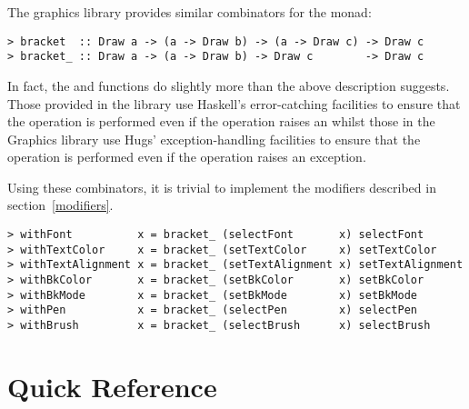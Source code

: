 
The graphics library provides similar combinators for the 
monad:
\begin{verbatim}
> bracket  :: Draw a -> (a -> Draw b) -> (a -> Draw c) -> Draw c
> bracket_ :: Draw a -> (a -> Draw b) -> Draw c        -> Draw c
\end{verbatim}

\begin{aside}
In fact, the  and  functions do slightly
more than the above description suggests.  Those provided in the
 library use Haskell's error-catching facilities to ensure that
the  operation is performed even if the  operation
raises an  whilst those in the Graphics library
use Hugs' exception-handling facilities to ensure that the 
operation is performed even if the  operation raises an
exception.
\end{aside}


Using these combinators, it is trivial to implement the modifiers
described in section~\ref{modifiers}.

\begin{verbatim}
> withFont          x = bracket_ (selectFont       x) selectFont
> withTextColor     x = bracket_ (setTextColor     x) setTextColor
> withTextAlignment x = bracket_ (setTextAlignment x) setTextAlignment
> withBkColor       x = bracket_ (setBkColor       x) setBkColor
> withBkMode        x = bracket_ (setBkMode        x) setBkMode
> withPen           x = bracket_ (selectPen        x) selectPen
> withBrush         x = bracket_ (selectBrush      x) selectBrush
\end{verbatim}










\appendix

\section{Quick Reference}

